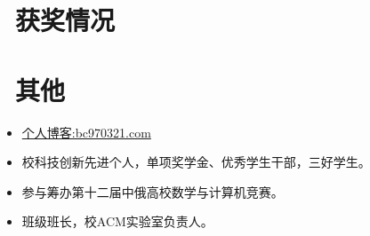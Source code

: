 \documentclass{resume}
\begin{document}
\medskip
\section{\faHeartO\ 获奖情况}
\medskip

\section{\faInfo\ 其他}
\begin{itemize}[parsep=0.5ex]
  \item 
  \href{http://bc970321.com}{个人博客:bc970321.com} 
  \item 校科技创新先进个人，单项奖学金、优秀学生干部，三好学生。
  \item 参与筹办第十二届中俄高校数学与计算机竞赛。
  \item 班级班长，校ACM实验室负责人。
\end{itemize}

%
%
\end{document}
